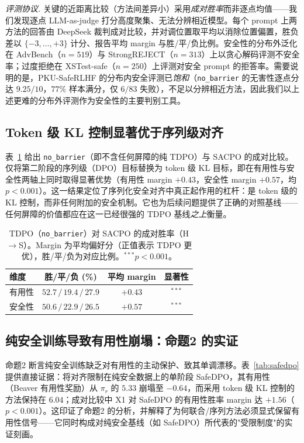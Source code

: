 \documentclass[lettersize,journal]{IEEEtran}
\begin{document}
\textit{评测协议.} 关键的近距离比较（方法间差异小）采用\emph{成对胜率}而非逐点均值——我们发现逐点 LLM-as-judge 打分高度聚集、无法分辨相近模型。每个 prompt 上两方法的回答由 DeepSeek 裁判成对比较，并对调位置取平均以消除位置偏置，胜负差以 $\{-3,\dots,+3\}$ 计分、报告平均 margin 与胜/平/负比例。安全性的分布外泛化在 AdvBench（$n{=}519$）与 StrongREJECT（$n{=}313$）上以贪心解码评测不安全率；过度拒绝在 XSTest-safe（$n{=}250$）上评测对安全 prompt 的拒答率。需要说明的是，PKU-SafeRLHF 的分布内安全评测已\emph{饱和}（\texttt{no\_barrier} 的无害性逐点分达 $9.25/10$，$77\%$ 样本满分，仅 $6/83$ 失败），不足以分辨相近方法，因此我们以上述更难的分布外评测作为安全性的主要判别工具。

\subsection{Token 级 KL 控制显著优于序列级对齐}\label{exp:tdpo}
表~\ref{tab:tdpo-vs-sacpo} 给出 \texttt{no\_barrier}（即不含任何屏障的纯 TDPO）与 SACPO 的成对比较。仅将第二阶段的序列级（DPO）目标替换为 token 级 KL 目标，即在有用性与安全性两轴上同时取得显著优势（有用性 margin $+0.43$，安全性 margin $+0.57$，均 $p<0.001$）。这一结果定位了序列化安全对齐中真正起作用的杠杆：是 token 级的 KL 控制，而非任何附加的安全机制。它也为后续问题提供了正确的对照基线——任何屏障的价值都应在这一已经很强的 TDPO 基线\emph{之上}衡量。

\begin{table}[t]
\centering
\caption{TDPO（\texttt{no\_barrier}）对 SACPO 的成对胜率（H$\to$S）。Margin 为平均偏好分（正值表示 TDPO 更优），胜/平/负为对应比例。$^{***}p<0.001$。}
\label{tab:tdpo-vs-sacpo}
\begin{tabular}{lccc}
\toprule
维度 & 胜/平/负 (\%) & 平均 margin & 显著性 \\
\midrule
有用性 & $52.7\,/\,19.4\,/\,27.9$ & $+0.43$ & $^{***}$ \\
安全性 & $50.6\,/\,22.9\,/\,26.5$ & $+0.57$ & $^{***}$ \\
\bottomrule
\end{tabular}
\end{table}

\subsection{纯安全训练导致有用性崩塌：命题2 的实证}\label{exp:drift}
命题2 断言纯安全训练缺乏对有用性的主动保护、致其单调漂移。表~\ref{tab:safedpo} 提供直接证据：将对齐限制在纯安全数据上的单阶段 SafeDPO，其有用性（Beaver 有用性奖励）从 $\pi_r$ 的 $5.33$ 崩塌至 $-0.64$，而采用 token 级 KL 控制的方法保持在 $6.04$；成对比较中 X1 对 SafeDPO 的有用性胜率 margin 达 $+1.56$（$p<0.001$）。这印证了命题2 的分析，并解释了为何联合/序列方法必须显式保留有用性信号——它同时构成对纯安全基线（如 SafeDPO）所代表的"受限制度"的实证刻画。
\end{document}
